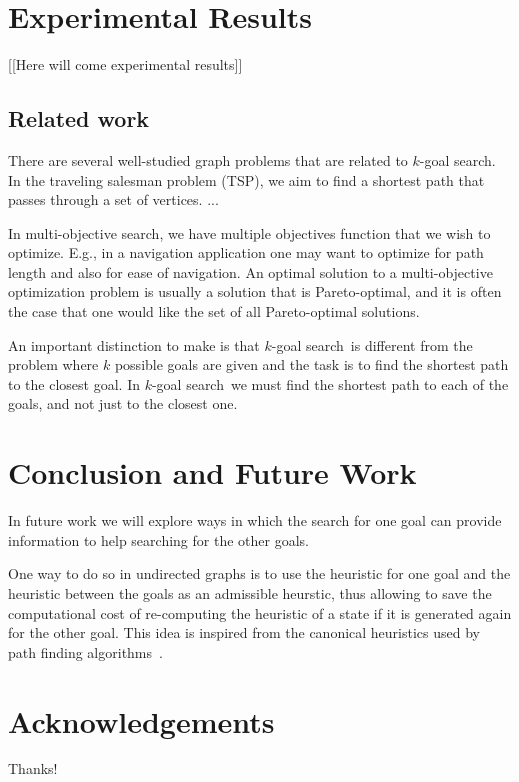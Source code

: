 \documentclass{aicom2e}
\newcommand{\kgs}{$k$-goal search}
\begin{document}
\section{Experimental Results}
[[Here will come experimental results]]

\subsection*{Related work}

There are several well-studied graph problems that are related to $k$-goal search. In the traveling salesman problem (TSP), we aim to find a shortest path that passes through a set of vertices. 
...

In multi-objective search, we have multiple objectives function that we wish to optimize. E.g., in a navigation application one may want to optimize for path length and also for ease of navigation. An optimal 
solution to a multi-objective optimization problem is usually a solution that is Pareto-optimal, and it is often the case that one would like the set of all Pareto-optimal solutions. 


An important distinction to make is that \kgs\ is different from the problem where $k$ possible goals are given and the task is to find the shortest path to the closest goal. In \kgs\ we must find the shortest path to each of the goals, and not just to the closest one. 



\section{Conclusion and Future Work}



In future work we will explore ways in which the search for one goal 
can provide information to help searching for the other goals. 

One way to do so in undirected graphs is to use the heuristic for one goal and the 
heuristic between the goals as an admissible heurstic, thus allowing to save the computational cost of re-computing the heuristic of a state if it is generated again for the other goal. This idea is inspired from the canonical heuristics used by path finding algorithms~\cite{canonical}.




\section*{Acknowledgements}
Thanks!



\end{document}
